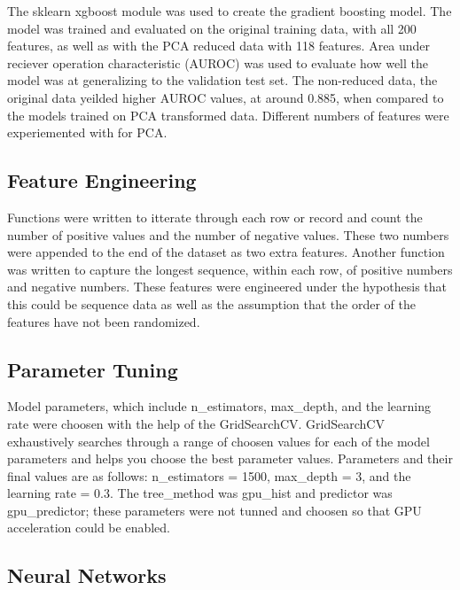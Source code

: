 \documentclass[11pt,letterpaper]{article}
\begin{document}

The sklearn xgboost module was used to create the gradient boosting model. The
model was trained and evaluated on the original training data, with all 200
features, as well as with the PCA reduced data with 118 features.  Area under
reciever operation characteristic (AUROC) was used to evaluate how well the
model was at generalizing to the validation test set.  The non-reduced data, the
original data yeilded higher AUROC values, at around 0.885, when compared to the
models trained on PCA transformed data.  Different numbers of features were
experiemented with for PCA. 

\subsection{Feature Engineering}

Functions were written to itterate through each row or record and count the
number of positive values and the number of negative values.  These two numbers
were appended to the end of the dataset as two extra features.  Another function
was written to capture the longest sequence, within each row, of positive
numbers and negative numbers.  These features were engineered under the
hypothesis that this could be sequence data as well as the  assumption that the
order of the features have not been randomized. 

\subsection{Parameter Tuning}

Model parameters, which include n\_estimators, max\_depth, and the learning rate
were choosen with the help of the GridSearchCV.  GridSearchCV exhaustively
searches through a range of choosen values for each of the model parameters and
helps you choose the best parameter values.  Parameters and their final values
are as follows: n\_estimators = 1500, max\_depth = 3, and the learning rate =
0.3. The tree\_method was gpu\_hist and predictor was gpu\_predictor; these
parameters were not tunned and choosen so that GPU acceleration could be
enabled.   

\iffalse
\subsection{Neural Networks}
\end{document}
